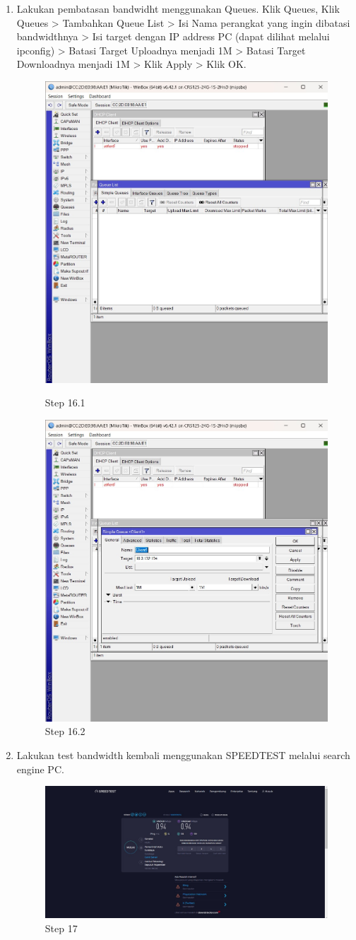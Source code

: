 \begin{enumerate}
	\item Lakukan pembatasan bandwidht menggunakan Queues. Klik Queues, Klik Queues > Tambahkan Queue List > Isi Nama perangkat yang ingin dibatasi bandwidthnya > Isi target dengan IP
	address PC (dapat dilihat melalui ipconfig) > Batasi Target Uploadnya menjadi 1M > Batasi Target Downloadnya menjadi 1M > Klik Apply > Klik OK.	
	\begin{figure}[H]
		\centering
		\includegraphics[width=0.5\linewidth]{P3/img/step16.jpg}
		\caption{Step 16.1}
		\label{fig:gambar4}

		\centering
		\includegraphics[width=0.5\linewidth]{P3/img/step16.2.jpg}
		\caption{Step 16.2}
		\label{fig:gambar4}
	\end{figure}

	\item Lakukan test bandwidth kembali menggunakan SPEEDTEST melalui search engine PC.
	\begin{figure}[H]
		\centering
		\includegraphics[width=0.7\linewidth]{P3/img/step17.jpg}
		\caption{Step 17}
		\label{fig:gambar4}
	\end{figure}

\end{enumerate}


